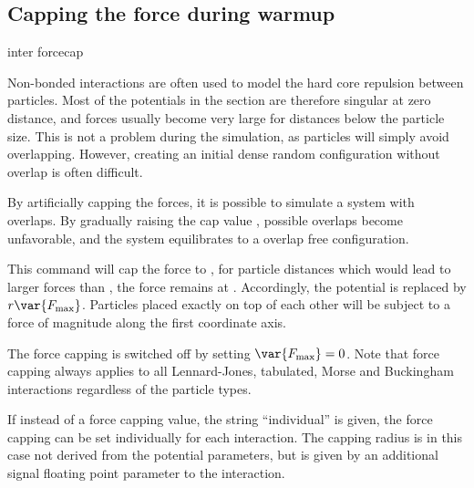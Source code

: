 \subsection{Capping the force during warmup}
\label{sec:forcecap}

\begin{essyntax}
  inter forcecap 
\end{essyntax}

Non-bonded interactions are often used to model the hard core
repulsion between particles. Most of the potentials in the section are
therefore singular at zero distance, and forces usually become very
large for distances below the particle size. This is not a problem
during the simulation, as particles will simply avoid overlapping.
However, creating an initial dense random configuration without
overlap is often difficult.

By artificially capping the forces, it is possible to simulate a
system with overlaps. By gradually raising the cap value
, possible overlaps become unfavorable, and the
system equilibrates to a overlap free configuration.

This command will cap the force to , \ie for
particle distances which would lead to larger forces than
, the force remains at .
Accordingly, the potential is replaced by $r \var{F_\mathrm{max}}$.
Particles placed exactly on top of each other will be subject to a
force of magnitude  along the first coordinate axis.

The force capping is switched off by setting $\var{F_\mathrm{max}}=0$.
Note that force capping always applies to all Lennard-Jones, tabulated,
Morse and Buckingham interactions regardless of the particle types.

If instead of a force capping value, the string ``individual'' is
given, the force capping can be set individually for each
interaction. The capping radius is in this case not derived from the
potential parameters, but is given by an additional signal floating
point parameter to the interaction.

